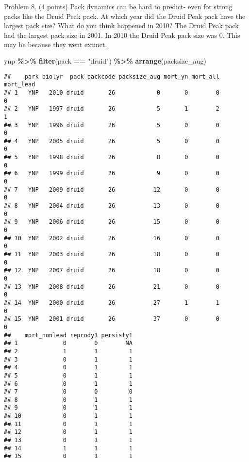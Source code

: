 \documentclass[
]{article}
\newenvironment{Shaded}{\begin{snugshade}}{\end{snugshade}}
\newcommand{\FunctionTok}[1]{\textcolor[rgb]{0.13,0.29,0.53}{\textbf{#1}}}
\newcommand{\NormalTok}[1]{#1}
\newcommand{\SpecialCharTok}[1]{\textcolor[rgb]{0.81,0.36,0.00}{\textbf{#1}}}
\newcommand{\StringTok}[1]{\textcolor[rgb]{0.31,0.60,0.02}{#1}}
\begin{document}
Problem 8. (4 points) Pack dynamics can be hard to predict- even for
strong packs like the Druid Peak pack. At which year did the Druid Peak
pack have the largest pack size? What do you think happened in 2010? The
Druid Peak pack had the largest pack size in 2001. In 2010 the Druid
Peak pack size was 0. This may be because they went extinct.

\begin{Shaded}
\begin{Highlighting}[]
\NormalTok{ynp }\SpecialCharTok{\%\textgreater{}\%} 
  \FunctionTok{filter}\NormalTok{(pack }\SpecialCharTok{==} \StringTok{"druid"}\NormalTok{) }\SpecialCharTok{\%\textgreater{}\%} 
  \FunctionTok{arrange}\NormalTok{(packsize\_aug)}
\end{Highlighting}
\end{Shaded}

\begin{verbatim}
##    park biolyr  pack packcode packsize_aug mort_yn mort_all mort_lead
## 1   YNP   2010 druid       26            0       0        0         0
## 2   YNP   1997 druid       26            5       1        2         1
## 3   YNP   1996 druid       26            5       0        0         0
## 4   YNP   2005 druid       26            5       0        0         0
## 5   YNP   1998 druid       26            8       0        0         0
## 6   YNP   1999 druid       26            9       0        0         0
## 7   YNP   2009 druid       26           12       0        0         0
## 8   YNP   2004 druid       26           13       0        0         0
## 9   YNP   2006 druid       26           15       0        0         0
## 10  YNP   2002 druid       26           16       0        0         0
## 11  YNP   2003 druid       26           18       0        0         0
## 12  YNP   2007 druid       26           18       0        0         0
## 13  YNP   2008 druid       26           21       0        0         0
## 14  YNP   2000 druid       26           27       1        1         0
## 15  YNP   2001 druid       26           37       0        0         0
##    mort_nonlead reprody1 persisty1
## 1             0        0        NA
## 2             1        1         1
## 3             0        1         1
## 4             0        1         1
## 5             0        1         1
## 6             0        1         1
## 7             0        0         0
## 8             0        1         1
## 9             0        1         1
## 10            0        1         1
## 11            0        1         1
## 12            0        1         1
## 13            0        1         1
## 14            1        1         1
## 15            0        1         1
\end{verbatim}
\end{document}
